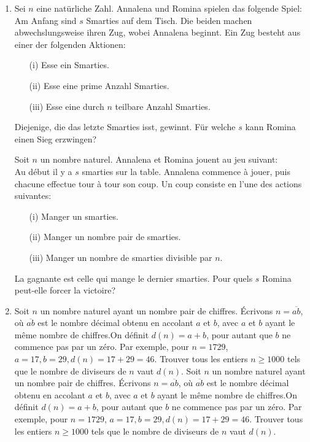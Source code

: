 \documentclass[language=german,style=exam]{smo}
\begin{document}
\begin{enumerate}[label=\textbf{\arabic*.}]
\bigskip\bigskip

\item\translation%
{Sei $n$ eine natürliche Zahl. Annalena und Romina spielen das folgende Spiel:\\
Am Anfang sind $s$ Smarties auf dem Tisch. Die beiden machen abwechslungsweise ihren Zug, wobei Annalena beginnt. Ein Zug besteht aus einer der folgenden Aktionen:
\begin{enumerate}
\item[(i)] Esse ein Smarties.
\item[(ii)] Esse eine prime Anzahl Smarties.
\item[(iii)] Esse eine durch $n$ teilbare Anzahl Smarties.
\end{enumerate}
Diejenige, die das letzte Smarties isst, gewinnt. Für welche $s$ kann Romina einen Sieg erzwingen?}
{Soit $n$ un nombre naturel. Annalena et Romina jouent au jeu suivant:\\
Au début il y a $s$ smarties sur la table. Annalena commence à jouer, puis chacune effectue tour à tour son coup. Un coup consiste en l'une des actions suivantes:
\begin{enumerate}
\item[(i)] Manger un smarties.
\item[(ii)] Manger un nombre pair de smarties.
\item[(iii)] Manger un nombre de smarties divisible par $n$.
\end{enumerate}
La gagnante est celle qui mange le dernier smarties. Pour quels $s$ Romina peut-elle forcer la victoire?}
{}

\bigskip\bigskip

\item\translation%
{Soit $n$ un nombre naturel ayant un nombre pair de chiffres. Écrivons $n=\overline{ab}$, où $\overline{ab}$ est le nombre décimal obtenu en accolant $a$ et $b$, avec $a$ et $b$ ayant le même nombre de chiffres.On définit $d(n)=a+b$, pour autant que $b$ ne commence pas par un zéro. Par exemple, pour $n=1729$, $a=17, b=29,d(n)=17+29=46$.
Trouver tous les entiers $n\geq 1000$ tels que le nombre de diviseurs de $n$ vaut $d(n)$.}
{Soit $n$ un nombre naturel ayant un nombre pair de chiffres. Écrivons $n=\overline{ab}$, où $\overline{ab}$ est le nombre décimal obtenu en accolant $a$ et $b$, avec $a$ et $b$ ayant le même nombre de chiffres.On définit $d(n)=a+b$, pour autant que $b$ ne commence pas par un zéro. Par exemple, pour $n=1729$, $a=17, b=29,d(n)=17+29=46$.
Trouver tous les entiers $n\geq 1000$ tels que le nombre de diviseurs de $n$ vaut $d(n)$.}
{}

\end{enumerate}

\bigskip

\vspace{1cm}

\end{document}
